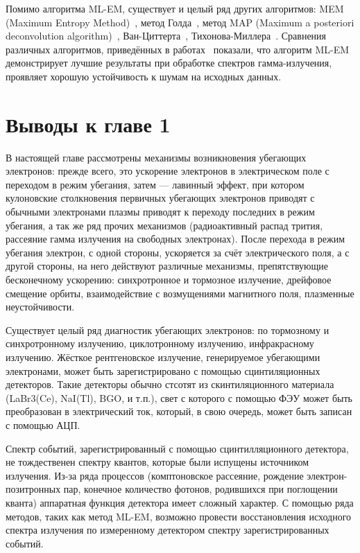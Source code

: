 Помимо алгоритма ML-EM, существует и целый ряд других алгоритмов: MEM (Maximum Entropy Method)~\cite{Jaynes1988,Meng2000}, метод Голда~\cite{Gold1964}, метод MAP (Maximum a posteriori deconvolution algorithm)~\cite{Hunt1994}, Ван-Циттерта~\cite{VanCittert1931}, Тихонова-Миллера~\cite{Tikhonov1963}. Сравнения различных алгоритмов, приведённых в работах~\cite{Meng2000,Morhac2011,Panontin2021,Lanteri1999,Jeffrey1986,Bouchet1995} показали, что алгоритм ML-EM демонстрирует лучшие результаты при обработке спектров гамма-излучения, проявляет хорошую устойчивость к шумам на исходных данных.


\FloatBarrier
\section{Выводы к главе 1}

В настоящей главе рассмотрены механизмы возникновения убегающих электронов: прежде всего, это ускорение электронов в электрическом поле с переходом в режим убегания, затем --- лавинный эффект, при котором кулоновские столкновения первичных убегающих электронов приводят с обычными электронами плазмы приводят к переходу последних в режим убегания, а так же ряд прочих механизмов (радиоактивный распад трития, рассеяние гамма излучения на свободных электронах). После перехода в режим убегания электрон, с одной стороны, ускоряется за счёт электрического поля, а с другой стороны, на него действуют различные механизмы, препятствующие бесконечному ускорению: синхротронное и тормозное излучение, дрейфовое смещение орбиты, взаимодействие с возмущениями магнитного поля, плазменные неустойчивости.

Существует целый ряд диагностик убегающих электронов: по тормозному и синхротронному излучению, циклотронному излучению, инфракрасному излучению. Жёсткое рентгеновское излучение, генерируемое убегающими электронами, может быть зарегистрировано с помощью сцинтиляционных детекторов. Такие детекторы обычно стсотят из скинтиляционного материала (LaBr3(Ce), NaI(Tl), BGO, и т.п.), свет с которого с помощью ФЭУ может быть преобразован в электрический ток, который, в свою очередь, может быть записан с помощью АЦП.

Спектр событий, зарегистрированный с помощью сцинтилляционного детектора, не тождественен спектру квантов, которые были испущены источником излучения. Из-за ряда процессов (комптоновское рассеяние, рождение электрон-позитронных пар, конечное количество фотонов, родившихся при поглощении кванта) аппаратная функция детектора имеет сложный характер. С помощью ряда методов, таких как метод ML-EM, возможно провести восстановления исходного спектра излучения по измеренному детектором спектру зарегистрированных событий.


\FloatBarrier
